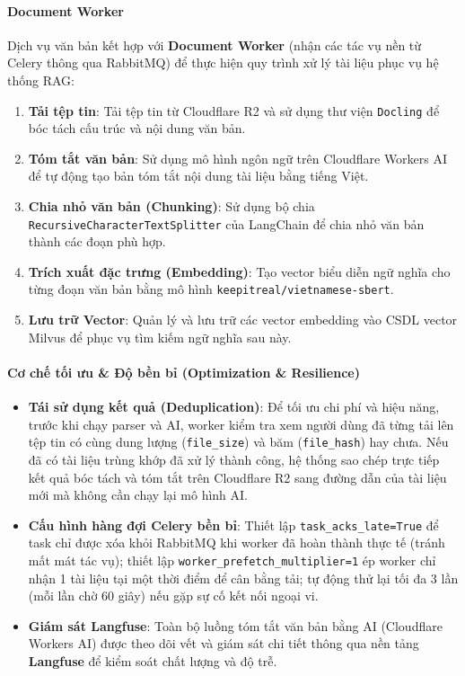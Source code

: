 \paragraph{Document Worker}

Dịch vụ văn bản kết hợp với \textbf{Document Worker} (nhận các tác vụ nền từ Celery thông qua RabbitMQ) để thực hiện quy trình xử lý tài liệu phục vụ hệ thống RAG:

\begin{enumerate}
\item \textbf{Tải tệp tin}: Tải tệp tin từ Cloudflare R2 và sử dụng thư viện \texttt{Docling} để bóc tách cấu trúc và nội dung văn bản.
\item \textbf{Tóm tắt văn bản}: Sử dụng mô hình ngôn ngữ trên Cloudflare Workers AI để tự động tạo bản tóm tắt nội dung tài liệu bằng tiếng Việt.
\item \textbf{Chia nhỏ văn bản (Chunking)}: Sử dụng bộ chia \texttt{RecursiveCharacterTextSplitter} của LangChain để chia nhỏ văn bản thành các đoạn phù hợp.
\item \textbf{Trích xuất đặc trưng (Embedding)}: Tạo vector biểu diễn ngữ nghĩa cho từng đoạn văn bản bằng mô hình \texttt{keepitreal/vietnamese-sbert}.
\item \textbf{Lưu trữ Vector}: Quản lý và lưu trữ các vector embedding vào CSDL vector Milvus để phục vụ tìm kiếm ngữ nghĩa sau này.
\end{enumerate}

\paragraph{Cơ chế tối ưu \& Độ bền bỉ (Optimization \& Resilience)}

\begin{itemize}
\item \textbf{Tái sử dụng kết quả (Deduplication)}: Để tối ưu chi phí và hiệu năng, trước khi chạy parser và AI, worker kiểm tra xem người dùng đã từng tải lên tệp tin có cùng dung lượng (\texttt{file\_size}) và băm (\texttt{file\_hash}) hay chưa. Nếu đã có tài liệu trùng khớp đã xử lý thành công, hệ thống sao chép trực tiếp kết quả bóc tách và tóm tắt trên Cloudflare R2 sang đường dẫn của tài liệu mới mà không cần chạy lại mô hình AI.

\item \textbf{Cấu hình hàng đợi Celery bền bỉ}: Thiết lập \texttt{task\_acks\_late=True} để task chỉ được xóa khỏi RabbitMQ khi worker đã hoàn thành thực tế (tránh mất mát tác vụ); thiết lập \texttt{worker\_prefetch\_multiplier=1} ép worker chỉ nhận 1 tài liệu tại một thời điểm để cân bằng tải; tự động thử lại tối đa 3 lần (mỗi lần chờ 60 giây) nếu gặp sự cố kết nối ngoại vi.

\item \textbf{Giám sát Langfuse}: Toàn bộ luồng tóm tắt văn bản bằng AI (Cloudflare Workers AI) được theo dõi vết và giám sát chi tiết thông qua nền tảng \textbf{Langfuse} để kiểm soát chất lượng và độ trễ.
\end{itemize}

